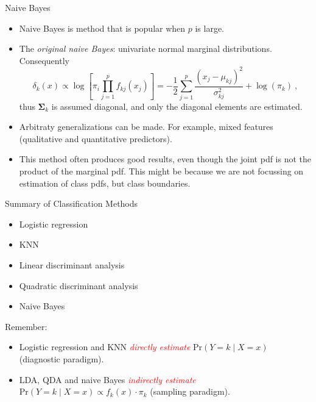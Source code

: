 \documentclass[10pt,ignorenonframetext,]{beamer}
\providecommand{\tightlist}{%
  \setlength{\itemsep}{0pt}\setlength{\parskip}{0pt}}
\begin{document}
\begin{frame}

\begin{block}{Naive Bayes}

\begin{itemize}
\item
  Naive Bayes is method that is popular when \(p\) is large.
\item
  The \emph{original naive Bayes}: univariate normal marginal
  distributions. Consequently
  \[\delta_k (x) \propto \log \left[ \pi_i \prod_{j=1}^p f_{kj}(x_j) \right] = - \frac{1}{2} \sum_{j=1}^p \frac{(x_j - \mu_{kj})^2}{\sigma_{kj}^2} + \log(\pi_k) \ , \]
  thus \(\boldsymbol{\Sigma}_k\) is assumed diagonal, and only the
  diagonal elements are estimated.
\item
  Arbitraty generalizations can be made. For example, mixed features
  (qualitative and quantitative predictors).
\item
  This method often produces good results, even though the joint pdf is
  not the product of the marginal pdf. This might be because we are not
  focussing on estimation of class pdfs, but class boundaries.
\end{itemize}

\end{block}

\end{frame}

\begin{frame}

\begin{block}{Summary of Classification Methods}

\begin{itemize}
\item
  Logistic regression
\item
  KNN
\item
  Linear discriminant analysis
\item
  Quadratic discriminant analysis
\item
  Naive Bayes
\end{itemize}

\vspace{4mm}

Remember:

\begin{itemize}
\tightlist
\item
  Logistic regression and KNN \emph{\textcolor{red}{directly estimate}}
  \(\text{Pr}(Y=k \mid X=x)\) (diagnostic paradigm).
\item
  LDA, QDA and naive Bayes \emph{\textcolor{red}{indirectly estimate}}
  \(\text{Pr}(Y=k \mid X=x) \propto f_k(x) \cdot \pi_k\) (sampling
  paradigm).
\end{itemize}

\vspace{2mm}

\end{block}

\end{frame}
\end{document}
